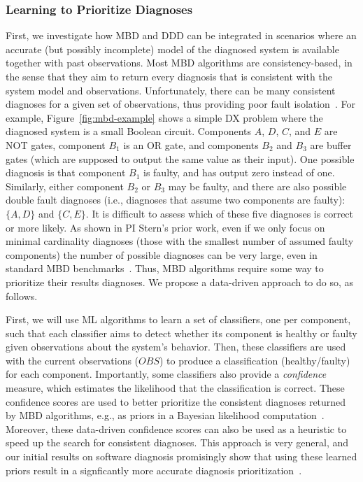 \documentclass[12pt]{article}
\begin{document}
\subsubsection{Learning to Prioritize Diagnoses} 
First, we investigate how MBD and DDD can be integrated in scenarios where an accurate (but possibly incomplete) model of the diagnosed system is available together with past observations. 
Most MBD algorithms are consistency-based, in the sense that they aim to return every diagnosis  that is consistent with the system model and observations. 
Unfortunately, there can be many consistent diagnoses for a given set of observations, thus providing poor fault isolation~\cite{stern2015many}. 
For example, Figure~\ref{fig:mbd-example} shows a simple DX problem where the diagnosed system is a small Boolean circuit. Components $A$, $D$, $C$, and $E$ are NOT gates, component $B_1$ is an OR gate, and components $B_2$ and $B_3$ are buffer gates (which are supposed to output the same value as their input). One possible diagnosis is that component $B_1$ is faulty, and has output zero instead of one. Similarly, either component $B_2$ or $B_3$ may be faulty, 
and there are also possible double fault diagnoses (i.e., diagnoses that assume two components are faulty): $\{ A,D \}$ and $\{C,E\}$. It is difficult to assess which of these five diagnoses is correct or more likely. 
As shown in PI Stern's prior work, even if we only focus on minimal cardinality diagnoses (those with the smallest number of assumed faulty components) the number of possible diagnoses can be very large, even in standard MBD benchmarks~\cite{stern2015many}. Thus, MBD algorithms require some way to prioritize their results diagnoses. We propose a data-driven approach to do so, as follows. 


First, we will use ML algorithms to learn a set of classifiers, one per component, such that each classifier aims to detect whether its component is healthy or faulty given observations about the system's behavior. 
Then, these classifiers are used with the current observations ($OBS$) to produce a classification (healthy/faulty) for each component. Importantly, some classifiers also provide a {\em confidence} measure, which estimates the likelihood that the classification is correct. These confidence scores are used 
to better prioritize the consistent diagnoses returned by MBD algorithms, e.g., as priors in a Bayesian likelihood computation~\cite{abreu2009new}. Moreover, these data-driven confidence scores can also be used as a heuristic to speed up the search for consistent diagnoses. This approach is very general, and our initial results on software  diagnosis promisingly show that using these learned priors result in a signficantly more accurate diagnosis prioritization~\cite{elmishali2016dataAugmented}. 
\end{document}
